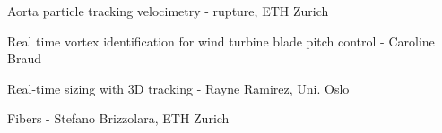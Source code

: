     \begin{frame}[label=app-4]{Aorta particle tracking velocimetry - rupture, ETH Zurich}
    \end{frame}
    
    
    \begin{frame}[label=app-5]{Real time vortex identification for wind turbine blade pitch control - Caroline Braud}
    \begin{multicols*}{2}
    \end{multicols*}
    \end{frame}
    
    \begin{frame}[label=app-6]{Real-time sizing with 3D tracking - Rayne Ramirez, Uni. Oslo}
    \begin{multicols*}{2}
    \end{multicols*}
    \end{frame}
    
    \begin{frame}[label=app-7]{Fibers - Stefano Brizzolara, ETH Zurich}
    
    \end{frame}
    
